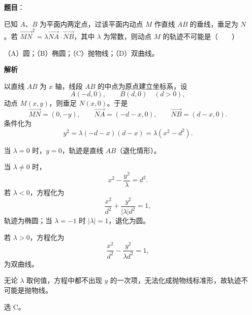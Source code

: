 \begin{answer}

\textbf{题目}：

已知 $A$、$B$ 为平面内两定点，过该平面内动点 $M$ 作直线 $AB$ 的垂线，垂足为 $N$。若 $\overrightarrow{MN}^2=\lambda\overrightarrow{NA}\cdot\overrightarrow{NB}$，其中 $\lambda$ 为常数，则动点 $M$ 的轨迹不可能是\mbox{（　　）}

（A）圆；（B）椭圆；（C）抛物线；（D）双曲线。

\textbf{解析}

以直线 $AB$ 为 $x$ 轴，线段 $AB$ 的中点为原点建立坐标系，设
\nopagebreak[4]
\[A(-d,0),\qquad B(d,0)\quad(d>0),\]
动点 $M(x,y)$，则垂足 $N(x,0)$。于是
\nopagebreak[4]
\[\overrightarrow{MN}=(0,-y),\qquad
\overrightarrow{NA}=(-d-x,0),\qquad
\overrightarrow{NB}=(d-x,0).\]
条件化为
\nopagebreak[4]
\[y^2=\lambda(-d-x)(d-x)=\lambda(x^2-d^2).\]

当 $\lambda=0$ 时，$y=0$，轨迹是直线 $AB$（退化情形）。

当 $\lambda\neq0$ 时，
\nopagebreak[4]
\[x^2-\frac{y^2}{\lambda}=d^2.\]
若 $\lambda<0$，方程化为
\nopagebreak[4]
\[\frac{x^2}{d^2}+\frac{y^2}{|\lambda|d^2}=1,\]
轨迹为椭圆；当 $\lambda=-1$ 时 $|\lambda|=1$，退化为圆。

若 $\lambda>0$，方程化为
\nopagebreak[4]
\[\frac{x^2}{d^2}-\frac{y^2}{\lambda d^2}=1,\]
为双曲线。

无论 $\lambda$ 取何值，方程中都不出现 $y$ 的一次项，无法化成抛物线标准形，故轨迹不可能是抛物线。

选 C。


\end{answer}
